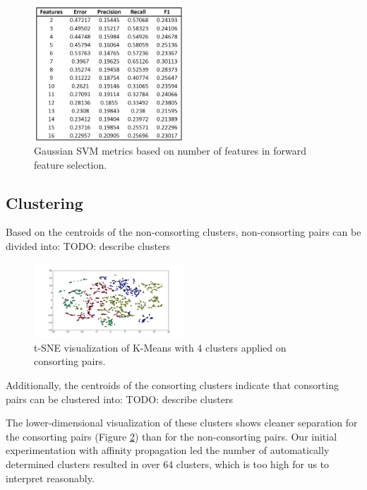 \documentclass[twoside,twocolumn,paper=letter,fontsize=11pt]{article}
\begin{document}
\begin{figure}
      \centering
          \includegraphics[width=0.5\textwidth]{../figs/ClassificationMetrics_RbfSVM.png}
  \caption{Gaussian SVM metrics based on number of features in forward feature selection.}
  \label{fig:rbf_svm_vis}
\end{figure}


\subsection{Clustering}
Based on the centroids of the non-consorting clusters, non-consorting pairs can
be divided into: {TODO: describe clusters}
\begin{figure}[h]
      \centering
          \includegraphics[width=0.5\textwidth]{../figs/consort_kmeans_2d_tsne.png}
  \caption{t-SNE visualization of K-Means with 4 clusters applied on consorting
  pairs.}
  \label{fig:consort_clustering_vis}
\end{figure}
Additionally, the centroids of the consorting clusters indicate that consorting
pairs can be clustered into: {TODO: describe clusters}

The lower-dimensional visualization of these clusters shows cleaner separation
for the consorting pairs (Figure \ref{fig:consort_clustering_vis}) than for the
non-consorting pairs.  Our initial experimentation with affinity propagation
led the number of automatically determined clusters resulted in over 64
clusters, which is too high for us to interpret reasonably.
\end{document}
